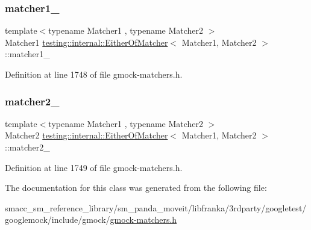 \subsubsection{\texorpdfstring{matcher1\+\_\+}{matcher1\_}}
{\footnotesize\ttfamily template$<$typename Matcher1 , typename Matcher2 $>$ \\
Matcher1 \hyperlink{classtesting_1_1internal_1_1EitherOfMatcher}{testing\+::internal\+::\+Either\+Of\+Matcher}$<$ Matcher1, Matcher2 $>$\+::matcher1\+\_\+\hspace{0.3cm}{\ttfamily [private]}}



Definition at line 1748 of file gmock-\/matchers.\+h.

\mbox{\label{classtesting_1_1internal_1_1EitherOfMatcher_a4c8a80860b5748dfb764744a8aae6a90}} 
\subsubsection{\texorpdfstring{matcher2\+\_\+}{matcher2\_}}
{\footnotesize\ttfamily template$<$typename Matcher1 , typename Matcher2 $>$ \\
Matcher2 \hyperlink{classtesting_1_1internal_1_1EitherOfMatcher}{testing\+::internal\+::\+Either\+Of\+Matcher}$<$ Matcher1, Matcher2 $>$\+::matcher2\+\_\+\hspace{0.3cm}{\ttfamily [private]}}



Definition at line 1749 of file gmock-\/matchers.\+h.



The documentation for this class was generated from the following file\+:\begin{DoxyCompactItemize}
\item 
smacc\+\_\+sm\+\_\+reference\+\_\+library/sm\+\_\+panda\+\_\+moveit/libfranka/3rdparty/googletest/googlemock/include/gmock/\hyperlink{gmock-matchers_8h}{gmock-\/matchers.\+h}\end{DoxyCompactItemize}
